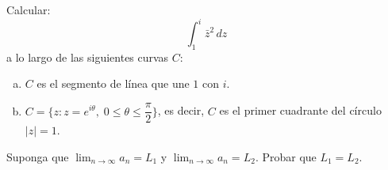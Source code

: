 \documentclass[11pt]{article}
\begin{document}
\begin{question}  %
    Calcular:
    \[ \int_1^i \bar{z}^2 \, dz \]
    a lo largo de las siguientes curvas $C$:
    \begin{enumerate}[a)]
        \item $C$ es el segmento de línea que une $1$ con $i$.
        \item $C = \{z : z = e^{i \theta}, \; 0 \leq \theta \leq \dfrac{\pi}{2}\} $, es decir, $C$ es el primer cuadrante del círculo $|z| = 1$.
    \end{enumerate}
\end{question}

\begin{question}%
    Suponga que $\lim_{n \rightarrow \infty} a_n = L_1$ y $\lim_{n \rightarrow \infty} a_n = L_2$. Probar que $L_1 = L_2$.
\end{question}
\end{document}
